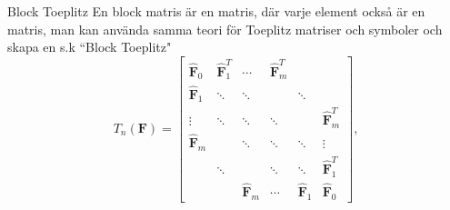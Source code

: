 \documentclass{beamer}
\begin{document}
\begin{frame}{Block Toeplitz}
En block matris är en matris, där varje element också är en matris, man kan använda samma teori för Toeplitz matriser och symboler och skapa en s.k ``Block Toeplitz" 
\begin{equation}
    T_n(\mathbf{F}) = \begin{bmatrix}
        \hat{\mathbf{F}}_0 & \hat{\mathbf{F}}_1^T &\cdots & \hat{\mathbf{F}}_m^T \\ 
        \hat{\mathbf{F}}_1& \ddots&\ddots & & \ddots \\
        \vdots & \ddots &\ddots & \ddots & & \hat{\mathbf{F}}_m^T \\
        \hat{\mathbf{F}}_m & & \ddots& \ddots&\ddots & \vdots \\
        & \ddots &  & \ddots&\ddots&\hat{\mathbf{F}}_1^T \\
        & & \hat{\mathbf{F}}_m& \cdots & \hat{\mathbf{F}}_1&\hat{\mathbf{F}}_0
    \end{bmatrix},
    \label{eq: block-matrix template}
\end{equation}
\end{frame}
\end{document}
